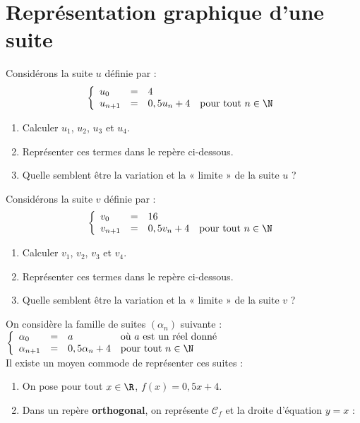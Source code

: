 \documentclass[a4paper,11pt,exos]{nsi} %
\begin{document}
\section*{Représentation graphique d'une suite}
\setlength{\columnseprule}{0.5pt}

\begin{multicols}{2}
	\exo{}
	Considérons la suite $u$ définie par :
	$$\left\{
	\begin{array}{llll}
		u_0 & = & 4 &\\ 
		u_{n+1} & = & 0,5u_n+4 & \text{pour tout } n\in\N\\
	\end{array}
	\right. $$
	\begin{enumerate}
		\item Calculer $u_1$, $u_2$, $u_3$ et $u_4$.
		\item Représenter ces termes dans le repère ci-dessous.
		\item Quelle semblent être la variation et la « limite » de la suite $u$ ?
	\end{enumerate}

	\exo{}
	Considérons la suite $v$ définie par :
	$$\left\{
	\begin{array}{llll}
		v_0 & = & 16 &\\ 
		v_{n+1} & = & 0,5v_n+4 & \text{pour tout } n\in\N\\
	\end{array}
	\right. $$
	\begin{enumerate}
		\item Calculer $v_1$, $v_2$, $v_3$ et $v_4$.
		\item Représenter ces termes dans le repère ci-dessous.
		\item Quelle semblent être la variation et la « limite » de la suite $v$ ?
	\end{enumerate}
	
\end{multicols}

\setlength{\columnseprule}{0pt}


\exo{}
On considère la famille de suites $(\alpha_n)$ suivante :
$\left\{
\begin{array}{llll}
	\alpha_0 & = & a & \text{où } a \text{ est un réel donné}\\ 
	\alpha_{n+1} & = & 0,5\alpha_n+4 & \text{pour tout } n\in\N\\
\end{array}
\right. $\\[.5em]
Il existe un moyen commode de représenter ces suites :
\begin{enumerate}[label=\textbullet]
	\item 	On pose pour tout $x\in\R$, $f(x)=0,5x+4$.
	\item 	Dans un repère \textbf{orthogonal}, on représente $\mathcal{C}_f$ et la droite d'équation $y=x$ :	
\end{enumerate}
\end{document}
